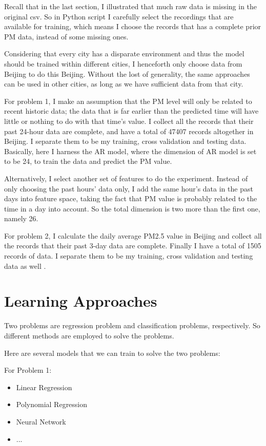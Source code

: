 \documentclass{sig-alternate}
\begin{document}
Recall that in the last section, I illustrated that much raw data is missing in the original csv. So in Python script I carefully select the recordings that are available for training, which means I choose the records that has a complete prior PM data, instead of some missing ones.

Considering that every city has a disparate environment and thus the model should be trained within different cities, I henceforth only choose data from Beijing to do this Beijing. Without the lost of generality, the same approaches can be used in other cities, as long as we have sufficient data from that city.

For problem 1, I make an assumption that the PM level will only be related to recent historic data; the data that is far earlier than the predicted time will have little or nothing to do with that time's value. I collect all the records that their past 24-hour data are complete, and have a total of 47407 records altogether in Beijing. I separate them to be my training, cross validation and testing data. Basically, here I harness the AR model, where the dimension of AR model is set to be 24, to train the data and predict the PM value.

 Alternatively, I select another set of features to do the experiment. Instead of only choosing the past hours' data only, I add the same hour's data in the past days into feature space, taking the fact that PM value is probably related to the time in a day into account. So the total dimension is two more than the first one, namely 26.

For problem 2, I calculate the daily average PM2.5 value in Beijing and collect all the records that their past 3-day data are complete. Finally I have a total of 1505 records of data. I separate them to be my training, cross validation and testing data as well .






\section{Learning Approaches}
Two problems are regression problem and classification problems, respectively. So different methods are employed to solve the problems.

Here are several models that we can train to solve the two problems:


For Problem 1:
\begin{itemize}
	\item Linear Regression
    \item Polynomial Regression
	\item Neural Network
    \item ...
\end{itemize}
\end{document}
